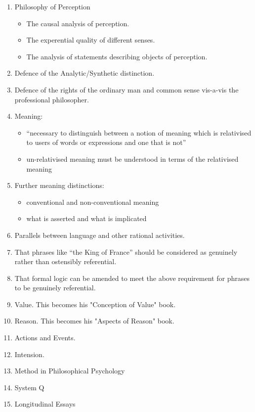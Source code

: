 \documentclass[10pt,titlepage]{book}
\begin{document}
\begin{enumerate}
\item Philosophy of Perception
\begin{itemize}
\item The causal analysis of perception.
\item The experential quality of different senses.
\item The analysis of statements describing objects of perception.
\end{itemize}

\item Defence of the Analytic/Synthetic distinction.

\item Defence of the rights of the ordinary man and common sense vis-a-vis the professional philosopher.

\item Meaning:
\begin{itemize}
\item ``necessary to distinguish between a notion of meaning which is relativised to users of words or expressions and one that is not''
\item un-relativised meaning must be understood in terms of the relativised meaning
\end{itemize}

\item Further meaning distinctions:
\begin{itemize}
\item conventional and non-conventional meaning
\item what is asserted and what is implicated
\end{itemize}

\item Parallels between language and other rational activities.

\item That phrases like ``the King of France'' should be considered as genuinely rather than ostensibly referential.

\item That formal logic can be amended to meet the above requirement for phrases to be genuinely referential.

\item Value. This becomes his "Conception of Value" book.

\item Reason. This becomes his "Aspects of Reason" book.

\item Actions and Events.

\item Intension.

\item Method in Philosophical Psychology

\item System Q

\item Longitudinal Essays

\end{enumerate}
\end{document}

